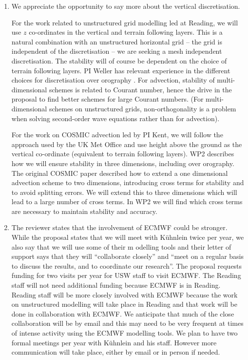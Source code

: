 \begin{enumerate}

\item \label{it:horizVert} We appreciate the opportunity to say more about the vertical discretisation.

For the work related to unstructured grid modelling led at Reading, we will use $z$ co-ordinates in the vertical and terrain following layers. This is a natural combination with an unstructured horizontal grid -- the grid is independent of the discretisation -- we are seeking a mesh independent discretisation. The stability will of course be dependent on the choice of terrain following layers. PI Weller has relevant experience in the different choices for discretisation over orography \cite[]{WS14,SW16,CWPS17,SWMD17}. For advection, stability of multi-dimensional schemes is related to Courant number, hence the drive in the proposal to find better schemes for large Courant numbers. (For multi-dimensional schemes on unstructured grids, non-orthogonality is a problem when solving second-order wave equations rather than for advection).

For the work on COSMIC advection led by PI Kent, we will follow the approach used by the UK Met Office and use height above the ground as the vertical co-ordinate (equivalent to terrain following layers). WP2 describes how we will ensure stability in three dimensions, including over orography. The original COSMIC paper \cite[]{LLM96} described how to extend a one dimensional advection scheme to two dimensions, introducing cross terms for stability and to avoid splitting errors. We will extend this to three dimensions which will lead to a large number of cross terms. In WP2 we will find which cross terms are necessary to maintain stability and accuracy.

\item \label{it:Kuhnlein} The reviewer states that the involvement of ECMWF could be stronger. While the proposal states that we will meet with K\"uhnlein twice per year, we also say that we will use some of their m
odelling tools and their letter of support says that they will ``collaborate closely'' and ``meet on a regular basis to discuss the results, and to coordinate our research''. The proposal requests funding for two visits per year for USW staff to visit ECMWF. The Reading staff will not need additional funding because ECMWF is in Reading. Reading staff will be more closely involved with ECMWF because the work on unstructured modelling will take place in Reading and that work will be done in collaboration with ECMWF. We anticipate that much of the close collaboration will be by email and this may need to be very frequent at times of intense activity using the ECMWF modelling tools. We plan to have two formal meetings per year with K\"uhnlein and his staff. However more communication will take place, either by email or in person if needed.


\end{enumerate}
